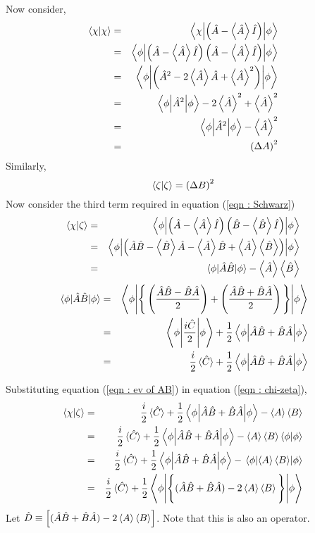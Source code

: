 \documentclass[12pt,a4paper,answers]{exam}
\newcommand{\A}{\hat{A}}
\newcommand{\B}{\hat{B}}
\newcommand{\C}{\hat{C}}
\newcommand{\I}{\hat{I}}
\begin{document}
\begin{questions}
\begin{solutionorbox}
		Now consider, 
		\begin{eqnarray}
			\nonumber \braket{\chi} &=& \mel**{\chi}{\left( \A-\expval{\A}\I \right)}{\phi}\\
			&=& \mel**{\phi}{\left( \A-\expval{\A}\I \right)\left( \A-\expval{\A}\I \right)}{\phi} \nonumber\\
			&=& \mel**{\phi}{\left( \A^2 - 2 \expval{\A}\A + \expval{\A}^2 \right)}{\phi} \nonumber\\
			&=&	\ev**{\A^2}{\phi} - 2 \expval{\A}^2 + \expval{\A}^2 \nonumber\\
			&=&	\ev**{\A^2}{\phi} - \expval{\A}^2 \nonumber\\
			&=& \left( \Delta A \right)^2 \label{eqn : chi^2}
		\end{eqnarray}
		Similarly,
		\begin{equation}\label{eqn : zeta^2}
			\braket{\zeta} = \left( \Delta B \right)^2
		\end{equation}
		Now consider the third term required in equation (\ref{eqn : Schwarz})
		\begin{eqnarray} \label{eqn : chi-zeta}
			\braket{\chi}{\zeta} &=& \mel**{\phi}{\left( \A-\expval{\A}\I \right)\left( \B-\expval{\B}\I \right)}{\phi}	\nonumber \\
			&=&	\mel**{\phi}{\left( \A\B - \ev{\B}\A - \ev{\A}\B + \ev{\A}\ev{\B} \right)}{\phi} 	\nonumber	\\
			&=&	\ev{\A\B}{\phi} - \ev{\A} \ev{\B}
		\end{eqnarray}
		\begin{eqnarray} \label{eqn : ev of AB}
			\expval{\A\B}{\phi} &=& \mel**{\phi}{\Bigg\{ \left( \dfrac{\A\B - \B\A}{2} \right) + \left( \dfrac{\A\B + \B\A}{2} \right) \Bigg\}}{\phi} \nonumber \\
			&=& \ev**{\dfrac{i\C}{2}}{\phi}  + \dfrac{1}{2} \ev**{\A\B+\B\A}{\phi}  \nonumber	\\
			&=& \dfrac{i}{2}\ev**{\C} + \dfrac{1}{2} \ev**{\A\B+\B\A}{\phi} 
		\end{eqnarray}
		
		Substituting equation (\ref{eqn : ev of AB}) in equation (\ref{eqn : chi-zeta}),
		\begin{eqnarray}
			\braket{\chi}{\zeta} &=& \dfrac{i}{2}\ev**{\C} + \dfrac{1}{2} \ev**{\A\B+\B\A}{\phi} - \ev{A}\ev{B} \nonumber \\
			&=& \dfrac{i}{2}\ev**{\C} + \dfrac{1}{2} \ev**{\A\B+\B\A}{\phi} - \ev{A}\ev{B} \braket{\phi} \nonumber \\
			& = & \dfrac{i}{2}\ev**{\C} + \dfrac{1}{2} \ev**{\A\B+\B\A}{\phi} - \ev{\ev{A}\ev{B}}{\phi} \nonumber \\
			& = & \dfrac{i}{2}\ev**{\C} + \dfrac{1}{2} \ev**{\Bigg\{ (\A\B+\B\A) - 2\ev{A}\ev{B} \Bigg\}}{\phi} \nonumber 
		\end{eqnarray}
		Let $\hat{D} \equiv \left[ (\A\B+\B\A) - 2\ev{A}\ev{B} \right]$. Note that this is also an operator. 
		

\end{solutionorbox}
\end{questions}
\end{document}
